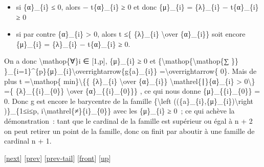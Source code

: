 \documentclass[]{article}
\begin{document}
\begin{itemize}
\itemsep1pt\parskip0pt
\item
  si \{α\}\_\{i\} ≤ 0, alors − t\{α\}\_\{i\} ≥ 0 et donc \{μ\}\_\{i\} =
  \{λ\}\_\{i\} − t\{α\}\_\{i\} ≥ 0
\item
  si par contre \{α\}\_\{i\} \textgreater{} 0, alors t ≤\{ \{λ\}\_\{i\}
  \textbackslash{}over \{α\}\_\{i\}\} soit encore \{μ\}\_\{i\} =
  \{λ\}\_\{i\} − t\{α\}\_\{i\} ≥ 0.
\end{itemize}

On a donc \textbackslash{}mathop\{∀\}i ∈ {[}1,p{]}, \{μ\}\_\{i\} ≥ 0 et
\{\textbackslash{}mathop\{\textbackslash{}mathop\{∑ \}\}
\}\_\{i=1\}\^{}\{p\}\{μ\}\_\{i\}\textbackslash{}overrightarrow\{g\{a\}\_\{i\}\}
=\textbackslash{}overrightarrow\{ 0\}. Mais de plus t
=\textbackslash{}mathop\{ min\}\textbackslash{}\{\{ \{λ\}\_\{i\}
\textbackslash{}over \{α\}\_\{i\}\}
\textbackslash{}mathrel\{∣\}\{α\}\_\{i\} \textgreater{}
0\textbackslash{}\} =\{ \{λ\}\_\{\{i\}\_\{0\}\} \textbackslash{}over
\{α\}\_\{\{i\}\_\{0\}\}\} , ce qui nous donne \{μ\}\_\{\{i\}\_\{0\}\} =
0. Donc g est encore le barycentre de la famille \{\textbackslash{}left
((\{a\}\_\{i\},\{μ\}\_\{i\})\textbackslash{}right )\}\_\{1≤i≤p,
i\textbackslash{}mathrel\{≠\}\{i\}\_\{0\}\} avec les \{μ\}\_\{i\} ≥ 0~;
ce qui achève la démonstration~: tant que le cardinal de la famille est
supérieur ou égal à n + 2 on peut retirer un point de la famille, donc
on finit par aboutir à une famille de cardinal n + 1.

{[}\href{coursse94.html}{next}{]} {[}\href{coursse92.html}{prev}{]}
{[}\href{coursse92.html\#tailcoursse92.html}{prev-tail}{]}
{[}\href{coursse93.html}{front}{]}
{[}\href{coursch18.html\#coursse93.html}{up}{]}
\end{document}
